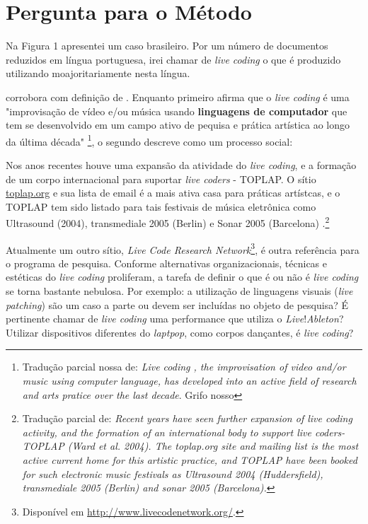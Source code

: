 \section{Pergunta para o Método}\label{sec:perguntametodo}

Na Figura 1 apresentei um caso brasileiro. Por um número de documentos reduzidos em língua portuguesa, irei chamar de \emph{live coding} o que é produzido utilizando moajoritariamente nesta língua.

 corrobora com definição de  . Enquanto primeiro afirma que o \emph{live coding} é uma  "improvisação de vídeo e/ou música usando \textbf{linguagens de computador} que tem se desenvolvido em um campo ativo de pequisa e prática artística ao longo da última década"  \footnote{Tradução parcial nossa de: \emph{Live coding , the improvisation of video and/or music using computer language, has developed into an active field of research and arts pratice over the last decade}. Grifo nosso}, o segundo descreve como um processo social:

\begin{citacao} 
Nos anos recentes houve uma expansão da atividade do \emph{live coding}, e a formação de um corpo internacional para suportar \emph{live coders} - TOPLAP. O sítio \url{toplap.org} e sua lista de email é a mais ativa casa para práticas artístcas, e o TOPLAP tem sido listado para tais festivais de música eletrônica como Ultrasound (2004), transmediale 2005 (Berlin) e Sonar 2005 (Barcelona) \cite[p.~3-4]{blackwell_programming_2005}.\footnote{Tradução parcial de: \emph{Recent years have seen further expansion of live coding activity, and the formation of an international body to support live coders- TOPLAP (Ward et al. 2004). The toplap.org site and mailing list is the most active current home for this artistic practice, and TOPLAP have been booked for such electronic music festivals as Ultrasound 2004 (Huddersfield), transmediale 2005 (Berlin) and sonar 2005 (Barcelona).}}
\end{citacao}

Atualmente um outro sítio, \emph{Live Code Research Network}\footnote{Disponível em \url{http://www.livecodenetwork.org/}.}, é outra referência para o programa de pesquisa. Conforme alternativas organizacionais, técnicas e estéticas do \emph{live coding} proliferam, a tarefa de definir o que é ou não é \emph{live coding} se torna bastante nebulosa. Por exemplo: a utilização de linguagens visuais (\emph{live patching}) são um caso a parte ou devem ser incluídas no objeto de pesquisa? É pertinente chamar de \emph{live coding} uma performance que utiliza o \emph{Live}!\emph{Ableton}? Utilizar dispositivos diferentes do \emph{laptpop}, como corpos dançantes, é \emph{live coding}? 

